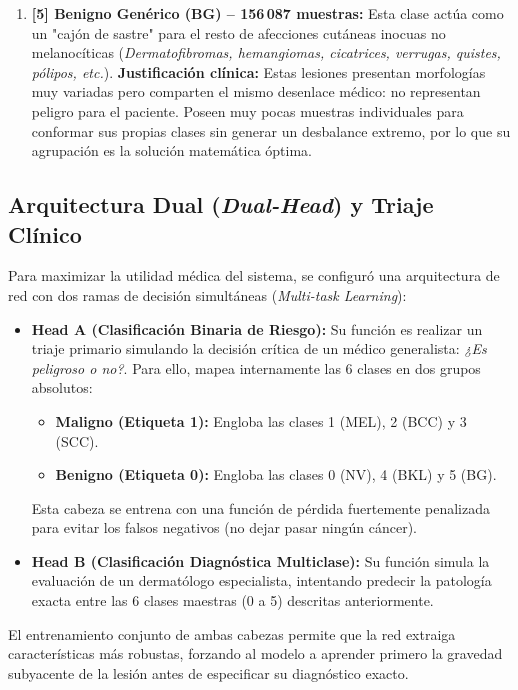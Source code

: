 \begin{enumerate}
	\item \textbf{[5] Benigno Genérico (BG) -- 156\,087 muestras:}
	Esta clase actúa como un "cajón de sastre" para el resto de afecciones cutáneas inocuas no melanocíticas (\textit{Dermatofibromas, hemangiomas, cicatrices, verrugas, quistes, pólipos, etc.}). \textbf{Justificación clínica:} Estas lesiones presentan morfologías muy variadas pero comparten el mismo desenlace médico: no representan peligro para el paciente. Poseen muy pocas muestras individuales para conformar sus propias clases sin generar un desbalance extremo, por lo que su agrupación es la solución matemática óptima.
\end{enumerate}

\subsection{Arquitectura Dual (\textit{Dual-Head}) y Triaje Clínico}
Para maximizar la utilidad médica del sistema, se configuró una arquitectura de red con dos ramas de decisión simultáneas (\textit{Multi-task Learning}):

\begin{itemize}
	\item \textbf{Head A (Clasificación Binaria de Riesgo):}
	Su función es realizar un triaje primario simulando la decisión crítica de un médico generalista: \textit{¿Es peligroso o no?}. Para ello, mapea internamente las 6 clases en dos grupos absolutos:
	\begin{itemize}
		\item \textbf{Maligno (Etiqueta 1):} Engloba las clases 1 (MEL), 2 (BCC) y 3 (SCC).
		\item \textbf{Benigno (Etiqueta 0):} Engloba las clases 0 (NV), 4 (BKL) y 5 (BG).
	\end{itemize}
	Esta cabeza se entrena con una función de pérdida fuertemente penalizada para evitar los falsos negativos (no dejar pasar ningún cáncer).
	
	\item \textbf{Head B (Clasificación Diagnóstica Multiclase):}
	Su función simula la evaluación de un dermatólogo especialista, intentando predecir la patología exacta entre las 6 clases maestras (0 a 5) descritas anteriormente.
\end{itemize}

El entrenamiento conjunto de ambas cabezas permite que la red extraiga características más robustas, forzando al modelo a aprender primero la gravedad subyacente de la lesión antes de especificar su diagnóstico exacto.

